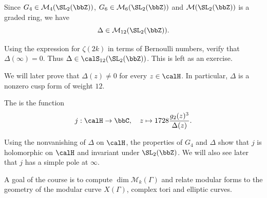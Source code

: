 Since $G_4 \in \mathcal{M}_4(\SL_2(\bbZ))$, $G_6 \in \mathcal{M}_6(\SL_2(\bbZ))$ and $\mathcal{M}(\SL_2(\bbZ))$ is a graded ring, we have
\[
    \Delta \in \mathcal{M}_{12}(\SL_2(\bbZ)).
\]

\begin{remarkstar}
    Using the expression for $\zeta(2k)$ in terms of Bernoulli numbers, verify that $\Delta(\infty) = 0$. Thus $\Delta \in \calS_{12}(\SL_2(\bbZ))$. This is left as an exercise.
\end{remarkstar}

\begin{remark}
    We will later prove that $\Delta(z) \neq 0$ for every $z \in \calH$. In particular, $\Delta$ is a nonzero cusp form of weight $12$.
\end{remark}

\begin{definition}
    The  is the function
    \[
        j : \calH \to \bbC, \quad z \mapsto 1728\frac{g_2(z)^3}{\Delta(z)}.
    \]
\end{definition}

\begin{remark}
    Using the nonvanishing of $\Delta$ on $\calH$, the properties of $G_4$ and $\Delta$ show that $j$ is holomorphic on $\calH$ and invariant under $\SL_2(\bbZ)$. We will also see later that $j$ has a simple pole at $\infty$.
\end{remark}

\begin{remarkstar}
    A goal of the course is to compute $\dim\mathcal{M}_k(\Gamma)$ and relate modular forms to the geometry of the modular curve $X(\Gamma)$, complex tori and elliptic curves.
\end{remarkstar}

